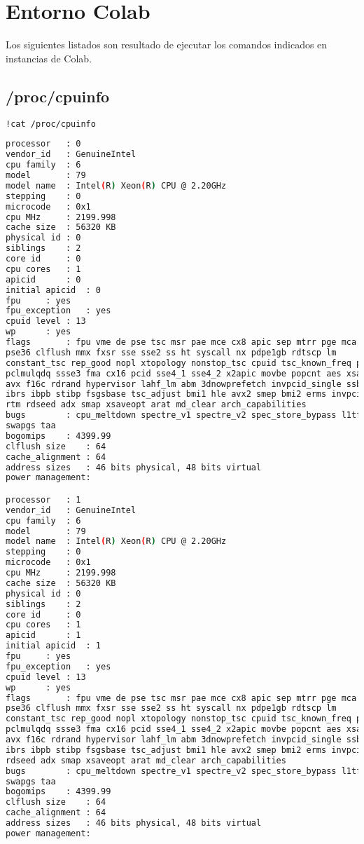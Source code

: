
\section{Entorno Colab}\label{app:colab}
Los siguientes listados son resultado de ejecutar los comandos indicados en instancias de Colab.

\subsection{/proc/cpuinfo}

\begin{lstlisting}[language=bash,tabsize=2,name=cpuinfo,frame=single]
!cat /proc/cpuinfo
\end{lstlisting}
\begin{lstlisting}[language=bash,name=cpuinfo,backgroundcolor=\color{Gray!20},lineskip=-1pt,basicstyle=\footnotesize]
processor	: 0
vendor_id	: GenuineIntel
cpu family	: 6
model		: 79
model name	: Intel(R) Xeon(R) CPU @ 2.20GHz
stepping	: 0
microcode	: 0x1
cpu MHz		: 2199.998
cache size	: 56320 KB
physical id	: 0
siblings	: 2
core id		: 0
cpu cores	: 1
apicid		: 0
initial apicid	: 0
fpu		: yes
fpu_exception	: yes
cpuid level	: 13
wp		: yes
flags		: fpu vme de pse tsc msr pae mce cx8 apic sep mtrr pge mca cmov pat 
pse36 clflush mmx fxsr sse sse2 ss ht syscall nx pdpe1gb rdtscp lm 
constant_tsc rep_good nopl xtopology nonstop_tsc cpuid tsc_known_freq pni 
pclmulqdq ssse3 fma cx16 pcid sse4_1 sse4_2 x2apic movbe popcnt aes xsave 
avx f16c rdrand hypervisor lahf_lm abm 3dnowprefetch invpcid_single ssbd 
ibrs ibpb stibp fsgsbase tsc_adjust bmi1 hle avx2 smep bmi2 erms invpcid 
rtm rdseed adx smap xsaveopt arat md_clear arch_capabilities
bugs		: cpu_meltdown spectre_v1 spectre_v2 spec_store_bypass l1tf mds 
swapgs taa
bogomips	: 4399.99
clflush size	: 64
cache_alignment	: 64
address sizes	: 46 bits physical, 48 bits virtual
power management:

processor	: 1
vendor_id	: GenuineIntel
cpu family	: 6
model		: 79
model name	: Intel(R) Xeon(R) CPU @ 2.20GHz
stepping	: 0
microcode	: 0x1
cpu MHz		: 2199.998
cache size	: 56320 KB
physical id	: 0
siblings	: 2
core id		: 0
cpu cores	: 1
apicid		: 1
initial apicid	: 1
fpu		: yes
fpu_exception	: yes
cpuid level	: 13
wp		: yes
flags		: fpu vme de pse tsc msr pae mce cx8 apic sep mtrr pge mca cmov pat
pse36 clflush mmx fxsr sse sse2 ss ht syscall nx pdpe1gb rdtscp lm 
constant_tsc rep_good nopl xtopology nonstop_tsc cpuid tsc_known_freq pni 
pclmulqdq ssse3 fma cx16 pcid sse4_1 sse4_2 x2apic movbe popcnt aes xsave 
avx f16c rdrand hypervisor lahf_lm abm 3dnowprefetch invpcid_single ssbd 
ibrs ibpb stibp fsgsbase tsc_adjust bmi1 hle avx2 smep bmi2 erms invpcid rtm 
rdseed adx smap xsaveopt arat md_clear arch_capabilities
bugs		: cpu_meltdown spectre_v1 spectre_v2 spec_store_bypass l1tf mds 
swapgs taa
bogomips	: 4399.99
clflush size	: 64
cache_alignment	: 64
address sizes	: 46 bits physical, 48 bits virtual
power management:
\end{lstlisting}

